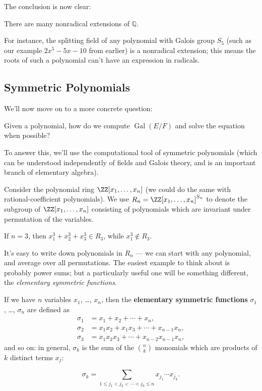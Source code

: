 The conclusion is now clear: 

\begin{corollary}
    There are many nonradical extensions of $\mathbb{Q}$. 
\end{corollary}

For instance, the splitting field of any polynomial with Galois group $S_5$ (such as our example $2x^5 - 5x - 10$ from earlier) is a nonradical extension; this means the roots of such a polynomial can't have an expression in radicals. 

\subsection{Symmetric Polynomials}

We'll now move on to a more concrete question:

\begin{qq}
    Given a polynomial, how do we compute $\operatorname{Gal}(E/F)$ and solve the equation when possible?
\end{qq}

To answer this, we'll use the computational tool of symmetric polynomials (which can be understood independently of fields and Galois theory, and is an important branch of elementary algebra). 

Consider the polynomial ring $\ZZ[x_1, \ldots, x_n]$ (we could do the same with rational-coefficient polynomials). We use $R_n = \ZZ[x_1, \ldots, x_n]^{S_n}$ to denote the subgroup of $\ZZ[x_1, \ldots, x_n]$ consisting of polynomials which are invariant under permutation of the variables. 

\begin{example}
    If $n = 3$, then $x_1^3 + x_2^3 + x_3^3 \in R_3$, while $x_1^3 \not\in R_3$. 
\end{example}

It's easy to write down polynomials in $R_n$ --- we can start with any polynomial, and average over all permutations. The easiest example to think about is probably power sums; but a particularly useful one will be something different, the \emph{elementary symmetric functions}. 

\begin{definition}
If we have $n$ variables $x_1$, \ldots, $x_n$, then the \textbf{elementary symmetric functions} $\sigma_1$, \ldots, $\sigma_n$ are defined as 
\begin{align*}
    \sigma_1 &= x_1 + x_2 + \cdots + x_n, \\
    \sigma_2 &= x_1x_2 + x_1x_3 + \cdots + x_{n-1}x_n, \\
    \sigma_3 &= x_1x_2x_3 + \cdots + x_{n-2}x_{n-1}x_n,
\end{align*}
and so on: in general, $\sigma_k$ is the sum of the $\binom{n}{k}$ monomials which are products of $k$ distinct terms $x_j$:

\[\sigma_k = \sum_{1 \leq j_1 < j_2 < \cdots < j_k \leq n} x_{j_1} \cdots x_{j_k}.\]
\end{definition}

